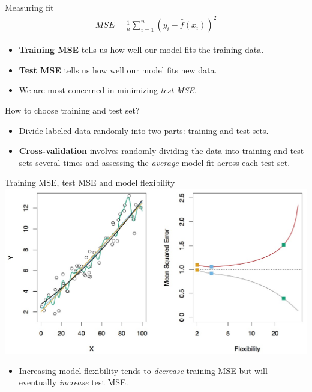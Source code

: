 \documentclass{beamer}
\begin{document}
\begin{frame}{Measuring fit } %
\begin{align*}
	MSE = \frac{1}{n} \sum_{i = 1}^{n} (y_{i} - \hat{f} (x_{i}) )^{2}
\end{align*} 
	\begin{itemize}
		\item \textbf{Training MSE} tells us how well our model fits the training data.
		\item \textbf{Test MSE} tells us  how well our  model fits new data.
		\item We are most concerned in minimizing \textit{test MSE}.
	\end{itemize}
\end{frame}

\begin{frame}{How to choose training and test set? } %

	\begin{itemize}
		\item Divide labeled data randomly into two parts: training and test sets.
		\item \textbf{Cross-validation} involves randomly dividing the data into training and test sets several times and assessing the \textit{average} model fit across each test set.
	\end{itemize}
\end{frame}

\begin{frame}{Training MSE, test MSE and model flexibility}
 \centering
\includegraphics[scale=.2]{trainingtest}

	\begin{itemize}
		\item Increasing model flexibility tends to \textit{decrease} training MSE but will eventually \textit{increase} test MSE.
	\end{itemize}
\end{frame}
\end{document}
